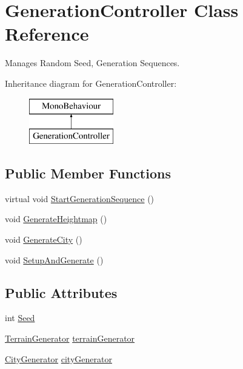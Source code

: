 \hypertarget{class_generation_controller}{}\section{Generation\+Controller Class Reference}
\label{class_generation_controller}


Manages Random Seed, Generation Sequences.  


Inheritance diagram for Generation\+Controller\+:\begin{figure}[H]
\begin{center}
\leavevmode
\includegraphics[height=2.000000cm]{class_generation_controller}
\end{center}
\end{figure}
\subsection*{Public Member Functions}
\begin{DoxyCompactItemize}
\item 
virtual void \mbox{\hyperlink{class_generation_controller_acd448bb5172dac81bd23d5adf5bf10b4}{Start\+Generation\+Sequence}} ()
\item 
void \mbox{\hyperlink{class_generation_controller_ab27f15ea71ed914f3ab494a7d99bb14f}{Generate\+Heightmap}} ()
\item 
void \mbox{\hyperlink{class_generation_controller_a45c2cd12e416dd1445b5182a6a2a7693}{Generate\+City}} ()
\item 
void \mbox{\hyperlink{class_generation_controller_a3588a2d352dbd2edfef4f9380207cf6c}{Setup\+And\+Generate}} ()
\end{DoxyCompactItemize}
\subsection*{Public Attributes}
\begin{DoxyCompactItemize}
\item 
int \mbox{\hyperlink{class_generation_controller_a8fc1d7ff7316969411545d4b4a7a547a}{Seed}}
\item 
\mbox{\hyperlink{class_terrain_generator}{Terrain\+Generator}} \mbox{\hyperlink{class_generation_controller_aca0b988596dc14d92fdbd9fb5037c2cd}{terrain\+Generator}}
\item 
\mbox{\hyperlink{class_city_generator}{City\+Generator}} \mbox{\hyperlink{class_generation_controller_a215ad934a6c4951844954b6b61b0187d}{city\+Generator}}
\end{DoxyCompactItemize}
